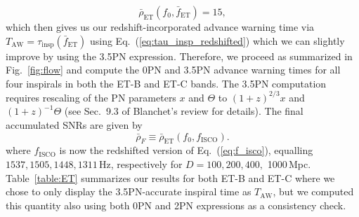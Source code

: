 \documentclass[prd,amsmath,amssymb,aps,floats,amsfonts,notitlepage,superscriptaddress,eqsecnum,nofootinbib,10pt]{revtex4-1}
\newcommand{\be}{\begin{equation}}
\newcommand{\ee}{\end{equation}}
\begin{document}
%
\be
\bar\rho_\text{ET}(f_0,\bar{f}_\text{ET}) = 15 \label{eq:ET_fbar},
\ee
%
%
which then gives us our redshift-incorporated advance warning time via $T_\text{AW}=\tau_\text{insp}(\bar{f}_\text{ET})$ using Eq.~(\ref{eq:tau_insp_redshifted}) which we can slightly improve by using the 3.5PN expression. 
Therefore, we proceed as summarized in Fig.~\ref{fig:flow} and compute the 0PN and 3.5PN advance warning times 
for all four inspirals in both the ET-B and ET-C bands.
The 3.5PN computation requires rescaling of the PN parameters $x$ and $\Theta$ to $(1+z)^{2/3} x$ and $(1+z)^{-1}\Theta $ (see Sec.~9.3 of 
Blanchet's review \cite{Blanchet_LRR} for details).
The final accumulated SNRs are given by
%
\be
\bar\rho_{F}\equiv \bar\rho_\text{ET}(f_0,f_\text{ISCO})  .\label{eq:rhoF_ET}
\ee
%
where $f_\text{ISCO}$ is now the redshifted version of Eq.~(\ref{eq:f_isco}), equalling $1537, 1505, 1448, 1311\,$Hz, respectively for $D=100,200,400,$ 1000\,Mpc.
Table~\ref{table:ET} summarizes our results for both ET-B and ET-C where we chose to only display the 3.5PN-accurate inspiral time as $T_\text{AW}$,
but we computed this quantity also using both 0PN and 2PN expressions as a consistency check.
\end{document}
